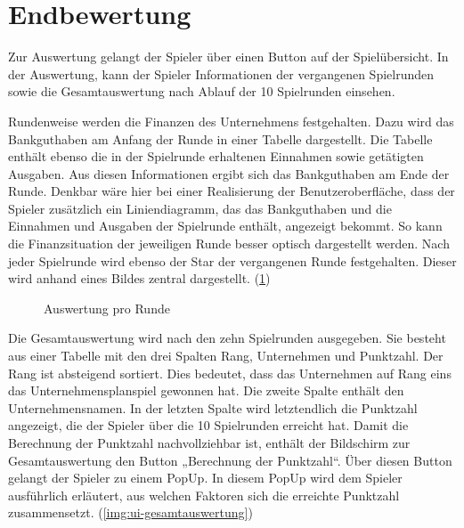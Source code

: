 \section{Endbewertung}
\label{sec:ui-endbewertung}

Zur Auswertung gelangt der Spieler über einen Button auf der Spielübersicht. In der Auswertung, kann der Spieler Informationen der vergangenen Spielrunden sowie die Gesamtauswertung nach Ablauf der 10 Spielrunden einsehen.
 
Rundenweise werden die Finanzen des Unternehmens festgehalten. Dazu wird das Bankguthaben am Anfang der Runde in einer Tabelle dargestellt. Die Tabelle enthält ebenso die in der Spielrunde erhaltenen Einnahmen sowie getätigten Ausgaben. Aus diesen Informationen ergibt sich das Bankguthaben am Ende der Runde. Denkbar wäre hier bei einer Realisierung der Benutzeroberfläche, dass der Spieler zusätzlich ein Liniendiagramm, das das Bankguthaben und die Einnahmen und Ausgaben der Spielrunde enthält, angezeigt bekommt. So kann die Finanzsituation der jeweiligen Runde besser optisch dargestellt werden. Nach jeder Spielrunde wird ebenso der Star der vergangenen Runde festgehalten. Dieser wird anhand eines Bildes zentral dargestellt. (\ref{img:ui-auswertung})

\begin{figure}[h]
  \centering
  \caption{Auswertung pro Runde}
  \label{img:ui-auswertung}
\end{figure}
 
Die Gesamtauswertung wird nach den zehn Spielrunden ausgegeben. Sie besteht aus einer Tabelle mit den drei Spalten Rang, Unternehmen und Punktzahl.  Der Rang ist absteigend sortiert. Dies bedeutet, dass das Unternehmen auf Rang eins das Unternehmensplanspiel gewonnen hat. Die zweite Spalte enthält den Unternehmensnamen. In der letzten Spalte wird letztendlich die Punktzahl angezeigt, die der Spieler über die 10 Spielrunden erreicht hat. Damit die Berechnung der Punktzahl nachvollziehbar ist, enthält der Bildschirm zur Gesamtauswertung den Button „Berechnung der Punktzahl“. Über diesen Button gelangt der Spieler zu einem PopUp. In diesem PopUp wird dem Spieler ausführlich erläutert, aus welchen Faktoren sich die erreichte Punktzahl zusammensetzt. (\ref{img:ui-gesamtauswertung})

